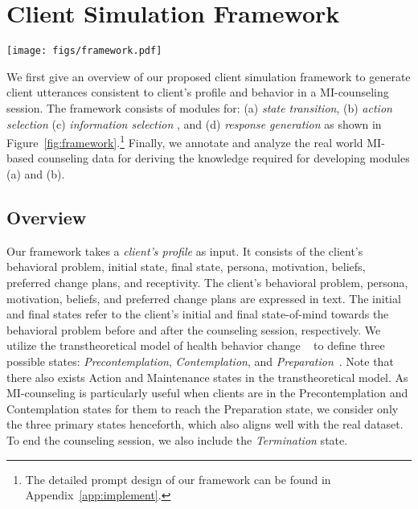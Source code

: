 \section{Client Simulation Framework}
\label{sec:framework}

\begin{figure*}[tb]
    \centering
    \texttt{[image: figs/framework.pdf]}
    \caption{Proposed Client Simulation Framework.}
    \label{fig:framework}
\end{figure*}


We first give an overview of our proposed client simulation framework to generate client utterances consistent to client's profile and behavior in a MI-counseling session.  The framework consists of modules for: (a) {\em state transition}, (b) {\em action selection} (c) {\em information selection} , and (d) {\em response generation} as shown in Figure~\ref{fig:framework}.\footnote{The detailed prompt design of our framework can be found in Appendix~\ref{app:implement}.} Finally, we annotate and analyze the real world MI-based counseling data for deriving the knowledge required for developing modules (a) and (b).

\subsection{Overview}

Our framework takes a {\em client's profile} as input. It consists of the client's behavioral problem, initial state, final state, persona, motivation, beliefs, preferred change plans, and receptivity.  The client's behavioral problem, persona, motivation, beliefs, and preferred change plans are expressed in text. The initial and final states refer to the client's initial and final state-of-mind towards the behavioral problem before and after the counseling session, respectively. We utilize the transtheoretical model of health behavior change ~\citep{abuse2019enhancing} to define three possible states: {\em Precontemplation}, {\em Contemplation}, and {\em Preparation}~\citep{prochaska1997transtheoretical, hashemzadeh2019transtheoretical}. Note that there also exists Action and Maintenance states in the transtheoretical model. As MI-counseling is particularly useful when clients are in the Precontemplation and Contemplation states for them to reach the Preparation state, we consider only the three primary states henceforth, which also aligns well with the real dataset. To end the counseling session, we also include the {\em Termination} state.  

